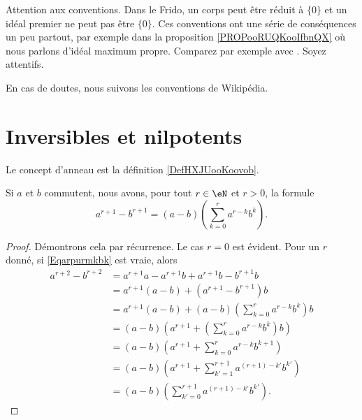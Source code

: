 
Attention aux conventions. Dans le Frido, un corps peut être réduit à \( \{ 0 \}\) et un idéal premier ne peut pas être \( \{ 0 \}\). Ces conventions ont une série de conséquences un peu partout, par exemple dans la proposition \ref{PROPooRUQKooIfbnQX} où nous parlons d'idéal maximum propre. Comparez par exemple avec \cite{ooWEUDooQybvIx}. Soyez attentifs.

En cas de doutes, nous suivons les conventions de Wikipédia.

\section{Inversibles et nilpotents}

Le concept d'anneau est la définition \ref{DefHXJUooKoovob}.

\begin{lemma}
    Si \( a\) et \( b\) commutent, nous avons, pour tout \( r \in \eN \) et \( r > 0\), la formule
    \begin{equation}        \label{Eqarpurmkbk}
        a^{r+1}-b^{r+1}=(a-b)\left(\sum_{k=0}^ra^{r-k}b^k\right).
    \end{equation}
\end{lemma}

\begin{proof}
  Démontrons cela par récurrence. Le cas \( r = 0 \) est évident. Pour
  un \( r \) donné, si \eqref{Eqarpurmkbk} est vraie, alors
  \begin{align*}
    a^{r+2}-b^{r+2}&= a^{r+1}a - a^{r+1}b +a^{r+1}b - b^{r+1}b\\
    &= a^{r+1}(a - b) + (a^{r+1} - b^{r+1})b\\
    &= a^{r+1}(a - b) + (a-b)\left(\sum_{k=0}^ra^{r-k}b^k\right)b\\
    &= (a - b) \left(a^{r+1} + \left(\sum_{k=0}^ra^{r-k}b^k\right)b\right)\\
    &= (a - b) \left(a^{r+1} + \sum_{k=0}^ra^{r-k}b^{k + 1}\right)\\
    &= (a - b) \left(a^{r+1} + \sum_{k'=1}^{r+1}a^{(r+1)-k'}b^{k'}\right)\\
    &= (a - b) \left(\sum_{k'=0}^{r+1}a^{(r+1)-k'}b^{k'}\right).
  \end{align*}
\end{proof}

